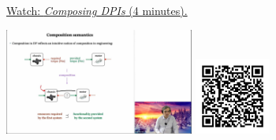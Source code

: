 
\begin{minipage}{10cm}
    \href{https://act4e-spring21.netlify.app/videos/spring2021-design:design:dpi-comp.html}{Watch: \emph{Composing DPIs} (4 minutes).}
        
    \href{https://act4e-spring21.netlify.app/videos/spring2021-design:design:dpi-comp.html}{\includegraphics[height=3.5cm]{spring2021-design:design:dpi-comp/thumbnails.jpg}}
    \href{https://act4e-spring21.netlify.app/videos/spring2021-design:design:dpi-comp.html}{\includegraphics[height=2.5cm]{spring2021-design:design:dpi-comp/qrcode.png}}
\end{minipage}
